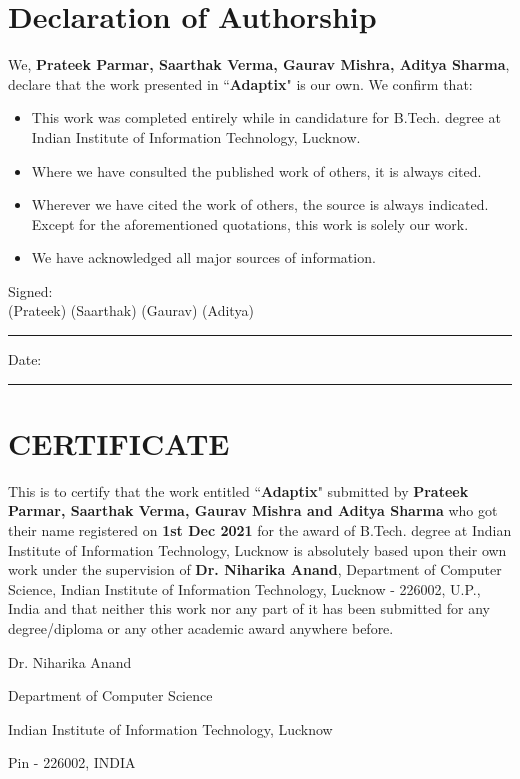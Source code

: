 \thispagestyle{empty}

\setcounter{page}{3}

\chapter*{Declaration of Authorship}

\vspace{1cm}

\noindent 
We, \textbf{Prateek Parmar, Saarthak Verma, Gaurav Mishra, Aditya Sharma}, declare that the work presented in ``\textbf{Adaptix}" is our own. We confirm that:

\medskip

\begin{itemize} 
    \item This work was completed entirely while in candidature for B.Tech. degree at Indian Institute of Information Technology, Lucknow.
    
    \medskip
    
    \item Where we have consulted the published work of others, it is always cited.
    
    \medskip
    
    \item Wherever we have cited the work of others, the source is always indicated. Except for the aforementioned quotations, this work is solely our work.
    
    \medskip
    
    \item We have acknowledged all major sources of information.
\end{itemize}

\vspace{2cm}

\noindent Signed:\\

\hspace{1.5cm}(Prateek) \hfill (Saarthak) \hfill (Gaurav) \hfill (Aditya)
\rule[0.5em]{33em}{0.5pt} 
 
\noindent Date:\\
\rule[0.5em]{33em}{0.5pt}

\cleardoublepage

\chapter*{CERTIFICATE}

This is to certify that the work entitled ``\textbf{Adaptix}" submitted by \textbf{Prateek Parmar, Saarthak Verma, Gaurav Mishra and Aditya Sharma} who got their name registered on \textbf{1st Dec 2021} for the award of B.Tech. degree at Indian Institute of Information Technology, Lucknow is absolutely based upon their own work under the supervision of \textbf{Dr. Niharika Anand}, Department of Computer Science, Indian Institute of Information Technology, Lucknow - 226002, U.P., India and that neither this work nor any part of it has been submitted for any degree/diploma or any other academic award anywhere before.  

\vspace{4cm}

\begin{center}
    Dr. Niharika Anand

    Department of Computer Science

    Indian Institute of Information Technology, Lucknow

    Pin - 226002, INDIA
\end{center}
